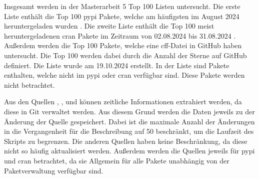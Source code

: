 Insgesamt werden in der Masterarbeit 5 Top 100 Listen untersucht.
Die erste Liste enthält die Top 100 \gls{pypi} Pakete, welche am häufigsten im August 2024 heruntergeladen wurden \autocite{kemenade_hugovktop-pypi-packages_2024}.
Die zweite Liste enthält die Top 100 meist heruntergeladenen \gls{cran} Pakete im Zeitraum von 02.08.2024 bis 31.08.2024 \autocite{csardi_r-hubcranlogsapp_2024}.
Außerdem werden die Top 100 Pakete, welche eine \gls{cff}-Datei in GitHub haben untersucht.
Die Top 100 werden dabei durch die Anzahl der Sterne auf GitHub definiert.
Die Liste wurde am 19.10.2024 erstellt.
In der Liste sind Pakete enthalten, welche nicht im \gls{pypi} oder \gls{cran} verfügbar sind.
Diese Pakete werden nicht betrachtet.

Aus den Quellen , ,  und  können zeitliche Informationen extrahiert werden, da diese in Git verwaltet werden.
Aus diesem Grund werden die Daten jeweils zu der Änderung der Quelle gespeichert.
Dabei ist die maximale Anzahl der Änderungen in die Vergangenheit für die Beschreibung auf 50 beschränkt, um die Laufzeit des Skripts zu begrenzen.
Die anderen Quellen haben keine Beschränkung, da diese nicht so häufig aktualisiert werden.
Außerdem werden die Quellen jeweils für \gls{pypi} und \gls{cran} betrachtet, da sie Allgemein für alle Pakete unabhängig von der Paketverwaltung verfügbar sind.


